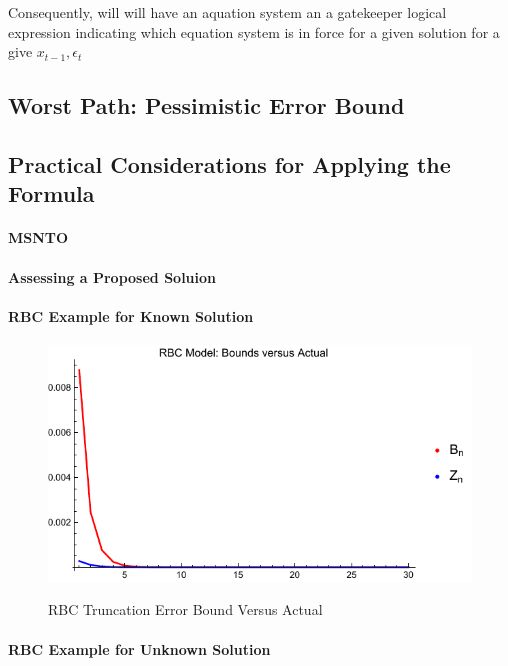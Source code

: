 \documentclass[12pt]{article}
\begin{document}
Consequently, will will have an aquation system an a gatekeeper logical expression indicating which equation system is in force for a given solution for a give $x_{t-1}, \epsilon_t$

\subsection{Worst Path: Pessimistic Error Bound}
\label{worst}

\subsection{Practical Considerations for Applying the Formula}
\label{sec:practicalformula}


\paragraph{MSNTO}
\paragraph{Assessing a Proposed Soluion}
\paragraph{RBC Example for Known Solution}


\begin{figure}
  \centering
\includegraphics{simpBoundsVActual.pdf}  
  \label{rbcTrunc}
  \caption{RBC Truncation Error Bound Versus Actual}
\end{figure}

\paragraph{RBC Example for Unknown Solution}
\end{document}
